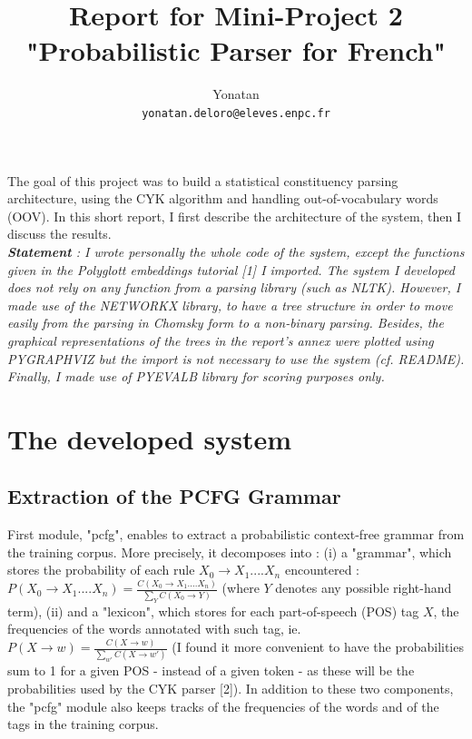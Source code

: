 \documentclass[8pt,twocolumn,letterpaper]{article}
\begin{document}
\title{Report for Mini-Project 2 "Probabilistic Parser for French"}


\author{Yonatan \\
{\tt\small yonatan.deloro@eleves.enpc.fr}
}


\maketitle

\small
The goal of this project was to build a statistical constituency parsing architecture, using the CYK algorithm and handling out-of-vocabulary words (OOV). In this short report, I first describe the architecture of the system, then I discuss the results. \\

\textit{\textbf{Statement} : I wrote personally the whole code of the system, except the functions given in the Polyglott embeddings tutorial [1] I imported. The system I developed does not rely on any function from a parsing library (such as NLTK). However, I made use of the NETWORKX library, to have a tree structure in order to move easily from the parsing in Chomsky form to a non-binary parsing. Besides, the graphical representations of the trees in the report's annex were plotted using PYGRAPHVIZ but the import is not necessary to use the system (cf. README). Finally, I made use of PYEVALB library for scoring purposes only.}\\

\section{The developed system}

\subsection{Extraction of the PCFG Grammar}

First module, "pcfg", enables to extract a probabilistic context-free grammar from the training corpus. More precisely, it decomposes into : (i) a "grammar", which stores the probability of each rule $X_0 \rightarrow X_1....X_n$ encountered : 
$P(X_0 \rightarrow X_1....X_n) = \frac{C(X_0 \rightarrow X_1....X_n)}{\sum_{Y} C(X_0 \rightarrow Y)}$ (where $Y$ denotes any possible right-hand term), (ii) and a "lexicon", which stores for each part-of-speech (POS) tag $X$, the frequencies of the words annotated with such tag, ie. $P(X \rightarrow w) = \frac{C(X \rightarrow w)}{\sum_{w'} C(X \rightarrow w')}$  (I found it more convenient to have the probabilities sum to 1 for a given POS - instead of a given token - as these will be the probabilities used by the CYK parser [2]).  In addition to these two components, the "pcfg" module also keeps tracks of the frequencies of the words and of the tags in the training corpus.
\end{document}
